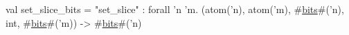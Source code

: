 val set_slice_bits = "set_slice" : forall 'n 'm.
  (atom('n), atom('m), #\hyperref[zbits]{bits}#('n), int, #\hyperref[zbits]{bits}#('m)) -> #\hyperref[zbits]{bits}#('n)
